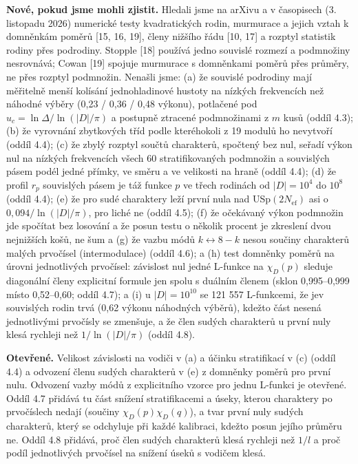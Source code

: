 \documentclass[
  10pt,
]{article}
\begin{document}
\textbf{Nové, pokud jsme mohli zjistit.} Hledali jsme na arXivu a v
časopisech (3. listopadu 2026) numerické testy kvadratických rodin,
murmurace a jejich vztah k domněnkám poměrů {[}15, 16, 19{]}, členy
nižšího řádu {[}10, 17{]} a rozptyl statistik rodiny přes podrodiny.
Stopple {[}18{]} používá jedno souvislé rozmezí a podmnožiny nesrovnává;
Cowan {[}19{]} spojuje murmurace s domněnkami poměrů přes průměry, ne
přes rozptyl podmnožin. Nenašli jsme: (a) že souvislé podrodiny mají
měřitelně menší kolísání jednohladinové hustoty na nízkých frekvencích
než náhodné výběry (0,23 / 0,36 / 0,48 výkonu), potlačené pod
\(u_c = \ln\Delta/\ln(|D|/\pi)\) a postupně ztracené podmnožinami z
\(m\) kusů (oddíl 4.3); (b) že vyrovnání zbytkových tříd podle
kteréhokoli z 19 modulů ho nevytvoří (oddíl 4.4); (c) že zbylý rozptyl
součtů charakterů, spočtený bez nul, seřadí výkon nul na nízkých
frekvencích všech 60 stratifikovaných podmnožin a souvislých pásem podél
jedné přímky, ve směru a ve velikosti na hraně (oddíl 4.4); (d) že
profil \(r_p\) souvislých pásem je táž funkce \(p\) ve třech rodinách od
\(|D| = 10^4\) do \(10^8\) (oddíl 4.4); (e) že pro sudé charaktery leží
první nula nad USp\((2N_{\mathrm{ef}})\) asi o \(0{,}094/\ln(|D|/\pi)\),
pro liché ne (oddíl 4.5); (f) že očekávaný výkon podmnožin jde spočítat
bez losování a že posun testu o několik procent je zkreslení dvou
nejnižších košů, ne šum a (g) že vazbu módů \(k \leftrightarrow 8 - k\)
nesou součiny charakterů malých prvočísel (intermodulace) (oddíl 4.6); a
(h) test domněnky poměrů na úrovni jednotlivých prvočísel: závislost nul
jedné L-funkce na \(\chi_D(p)\) sleduje diagonální členy explicitní
formule jen spolu s duálním členem (sklon 0,995--0,999 místo 0,52--0,60;
oddíl 4.7); a (i) u \(|D| = 10^{10}\) se 121 557 L-funkcemi, že jev
souvislých rodin trvá (0,62 výkonu náhodných výběrů), kdežto část nesená
jednotlivými prvočísly se zmenšuje, a že člen sudých charakterů u první
nuly klesá rychleji než \(1/\ln(|D|/\pi)\) (oddíl 4.8).

\textbf{Otevřené.} Velikost závislosti na vodiči v (a) a účinku
stratifikací v (c) (oddíl 4.4) a odvození členu sudých charakterů v (e)
z domněnky poměrů pro první nulu. Odvození vazby módů z explicitního
vzorce pro jednu L-funkci je otevřené. Oddíl 4.7 přidává tu část snížení
stratifikacemi a úseky, kterou charaktery po prvočíslech nedají (součiny
\(\chi_D(p)\chi_D(q)\)), a tvar první nuly sudých charakterů, který se
odchyluje při každé kalibraci, kdežto posun jejího průměru ne. Oddíl 4.8
přidává, proč člen sudých charakterů klesá rychleji než \(1/l\) a proč
podíl jednotlivých prvočísel na snížení úseků s vodičem klesá.
\end{document}
